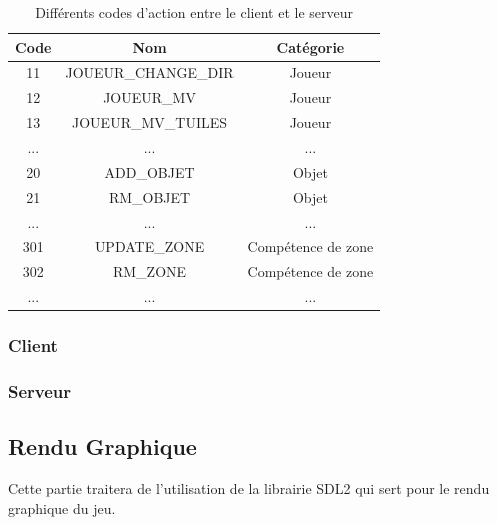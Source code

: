 \documentclass[11pt]{article}
\begin{document}
            \begin{table}[h]
                \centering
                \begin{tabular}{|c|c|c|}
                    \hline
                    Code & Nom & Catégorie \\
                    \hline
                    11 & JOUEUR\_CHANGE\_DIR & Joueur \\
                    12 & JOUEUR\_MV & Joueur \\
                    13 & JOUEUR\_MV\_TUILES & Joueur \\
                    ... & ... & ... \\
                    20 & ADD\_OBJET & Objet \\
                    21 & RM\_OBJET & Objet \\
                    ... & ... & ... \\
                    301 & UPDATE\_ZONE & Compétence de zone \\
                    302 & RM\_ZONE & Compétence de zone \\
                    ... & ... & ... \\
                    \hline
                \end{tabular}
                \caption{Différents codes d'action entre le client et le serveur}
                \label{tab:tabCliServ}
            \end{table}

            \subsubsection{Client}
            \subsubsection{Serveur}
        \subsection{Rendu Graphique}
        Cette partie traitera de l'utilisation de la librairie SDL2 qui sert pour le rendu graphique du jeu.
\end{document}
